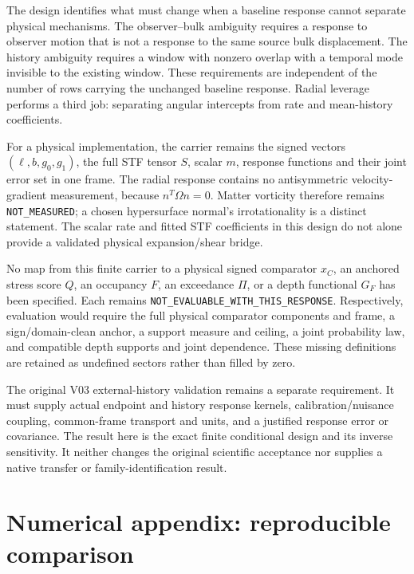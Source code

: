 The design identifies what must change when a baseline response cannot separate physical mechanisms. The observer--bulk ambiguity requires a response to observer motion that is not a response to the same source bulk displacement. The history ambiguity requires a window with nonzero overlap with a temporal mode invisible to the existing window. These requirements are independent of the number of rows carrying the unchanged baseline response. Radial leverage performs a third job: separating angular intercepts from rate and mean-history coefficients.

For a physical implementation, the carrier remains the signed vectors \((\ell,b,g_0,g_1)\), the full STF tensor \(S\), scalar \(m\), response functions and their joint error set in one frame. The radial response contains no antisymmetric velocity-gradient measurement, because \(n^T\Omega n=0\). Matter vorticity therefore remains \texttt{NOT\_MEASURED}; a chosen hypersurface normal's irrotationality is a distinct statement. The scalar rate and fitted STF coefficients in this design do not alone provide a validated physical expansion/shear bridge.

No map from this finite carrier to a physical signed comparator \(x_C\), an anchored stress score \(Q\), an occupancy \(F\), an exceedance \(\Pi\), or a depth functional \(G_F\) has been specified. Each remains \texttt{NOT\_EVALUABLE\_WITH\_THIS\_RESPONSE}. Respectively, evaluation would require the full physical comparator components and frame, a sign/domain-clean anchor, a support measure and ceiling, a joint probability law, and compatible depth supports and joint dependence. These missing definitions are retained as undefined sectors rather than filled by zero.

The original V03 external-history validation remains a separate requirement. It must supply actual endpoint and history response kernels, calibration/nuisance coupling, common-frame transport and units, and a justified response error or covariance. The result here is the exact finite conditional design and its inverse sensitivity. It neither changes the original scientific acceptance nor supplies a native transfer or family-identification result.

\hypertarget{numerical-appendix-reproducible-comparison}{%
\appendix
\section{Numerical appendix: reproducible comparison}\label{numerical-appendix-reproducible-comparison}}

